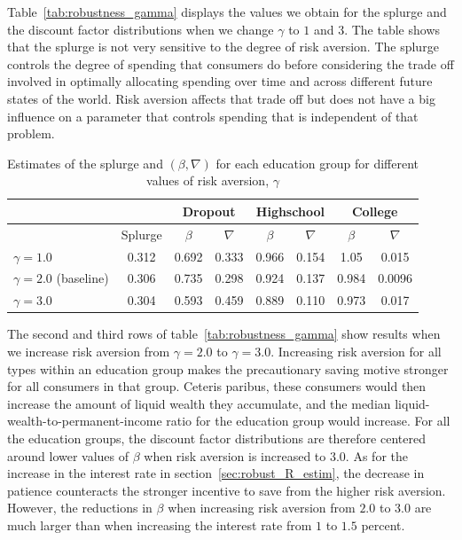 \documentclass[\econtexRoot/HAFiscal]{subfiles}
\begin{document}
Table~\ref{tab:robustness_gamma} displays the values we obtain for the splurge and the discount factor distributions when we change $\gamma$ to $1$ and $3$. The table shows that the splurge is not very sensitive to the degree of risk aversion. The splurge controls the degree of spending that consumers do before considering the trade off involved in optimally allocating spending over time and across different future states of the world. Risk aversion affects that trade off but does not have a big influence on a parameter that controls spending that is independent of that problem. 

\begin{table}[t]
  \begin{center}
    \begin{tabular}{lc|cccccc} 
      \toprule
      & & \multicolumn{2}{c}{Dropout} & \multicolumn{2}{c}{Highschool} & \multicolumn{2}{c}{College} \\ \midrule 
      & Splurge & $\beta$ & $\nabla$ & $\beta$ & $\nabla$ & $\beta$ & $\nabla$ \\ \midrule 
      $\gamma = 1.0$ & 0.312 & 0.692 & 0.333 & 0.966 & 0.154 & 1.05 & 0.015 \\ 
      $\gamma = 2.0$ (baseline) & 0.306 & 0.735 & 0.298 & 0.924 & 0.137 & 0.984 & 0.0096 \\
      $\gamma = 3.0$ & 0.304 & 0.593 & 0.459 & 0.889 & 0.110 & 0.973 & 0.017 
      \\ \bottomrule 
    \end{tabular}
    \caption{Estimates of the splurge and $(\beta,\nabla)$ for each education group for different values of risk aversion, $\gamma$}
    \notinsubfile{\label{tab:robustness_gamma}}
  \end{center}
\end{table}

The second and third rows of table~\ref{tab:robustness_gamma} show results when we increase risk aversion from $\gamma=2.0$ to $\gamma=3.0$. Increasing risk aversion for all types within an education group makes the precautionary saving motive stronger for all consumers in that group. Ceteris paribus, these consumers would then increase the amount of liquid wealth they accumulate, and the median liquid-wealth-to-permanent-income ratio for the education group would increase. For all the education groups, the discount factor distributions are therefore centered around lower values of $\beta$ when risk aversion is increased to $3.0$. As for the increase in the interest rate in section~\ref{sec:robust_R_estim}, the decrease in patience counteracts the stronger incentive to save from the higher risk aversion. However, the reductions in $\beta$ when increasing risk aversion from $2.0$ to $3.0$ are much larger than when increasing the interest rate from $1$ to $1.5$ percent. 
\end{document}
